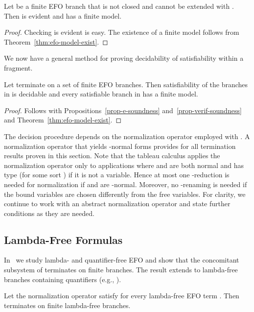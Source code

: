 \begin{prop}
  \label{prop-verif-soundness}
  Let  be a finite EFO branch that is not closed and
  cannot be extended with .  Then 
  is evident and has a finite model.
\end{prop}
\begin{proof}
  Checking  is evident is easy.  The existence of a finite model follows from Theorem~\ref{thm:efo-model-exist}.
\end{proof}

We now have a general method for proving decidability of satisfiability
within a fragment.

\begin{prop}
  Let  terminate on a set  of finite
  EFO branches.  Then satisfiability of the branches in
   is decidable and every satisfiable branch in
   has a finite model.
\end{prop}

\begin{proof}
  Follows with Propositions~\ref{prop-e-soundness}
  and~\ref{prop-verif-soundness} and
  Theorem~\ref{thm:efo-model-exist}.
\end{proof}

The decision procedure depends on the normalization
operator employed with .  A normalization
operator that yields -normal forms provides for
all termination results proven in this section.  Note
that the tableau calculus applies the normalization
operator only to applications  where  and 
are both normal and  has type  (for some sort ) if it is not a
variable.  Hence at most one -reduction is
needed for normalization if  and  are
-normal.  Moreover, no -renaming is
needed if the bound variables are chosen differently
from the free variables.  For clarity, we continue to
work with an abstract normalization operator and state
further conditions as they are needed.

\subsection{Lambda-Free Formulas}

In~\cite{BrownSmolkaBasic} we study lambda- and
quantifier-free EFO and show that the concomitant
subsystem of  terminates on finite branches.  The
result extends to lambda-free branches containing
quantifiers (e.g., ).

\begin{prop}
  Let the normalization operator satisfy\lmcs{\linebreak}
   for
  every lambda-free EFO term .  Then 
  terminates on finite lambda-free branches.
\end{prop}

